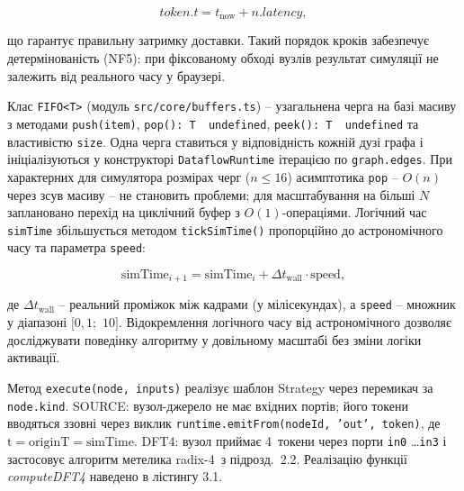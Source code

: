 \documentclass[
]{article}
\begin{document}
\[token.t = t_{\text{now}} + n.latency,\]

що гарантує правильну затримку доставки. Такий порядок кроків забезпечує
детермінованість (NF5): при фіксованому обході вузлів результат
симуляції не залежить від реального часу у браузері.

Клас \texttt{FIFO\textless{}T\textgreater{}} (модуль
\texttt{src}\texttt{/}\texttt{core}\texttt{/}\texttt{buffers.ts}) --
узагальнена черга на базі масиву з методами
\texttt{push}\texttt{(}\texttt{item}\texttt{)},
\texttt{pop}\texttt{():\ T\ \textbar{}\ }\texttt{undefined},
\texttt{peek}\texttt{():\ T\ \textbar{}\ }\texttt{undefined} та
властивістю \texttt{size}. Одна черга ставиться у відповідність кожній
дузі графа і ініціалізуються у конструкторі \texttt{DataflowRuntime}
ітерацією по \texttt{graph.edges}. При характерних для симулятора
розмірах черг (\(n \leq 16\)) асимптотика \texttt{pop} -- \(O(n)\) через
зсув масиву -- не становить проблеми; для масштабування на більші \(N\)
заплановано перехід на циклічний буфер з \(O(1)\)-операціями. Логічний
час \texttt{simTime} збільшується методом
\texttt{tickSimTime}\texttt{()} пропорційно до астрономічного часу та
параметра \texttt{speed}:

\[\text{simTime}_{i + 1} = \text{simTime}_{i} + \Delta t_{\text{wall}} \cdot \text{speed},\]

де \(\Delta t_{\text{wall}}\) -- реальний проміжок між кадрами (у
мілісекундах), а \texttt{speed} -- множник у діапазоні
\(\lbrack 0,1;\mspace{6mu} 10\rbrack\). Відокремлення логічного часу від
астрономічного дозволяє досліджувати поведінку алгоритму у довільному
масштабі без зміни логіки активації.

Метод
\texttt{execute}\texttt{(}\texttt{node}\texttt{,\ }\texttt{inputs}\texttt{)}
реалізує шаблон Strategy через перемикач за \texttt{node.kind}. SOURCE:
вузол-джерело не має вхідних портів; його токени вводяться ззовні через
виклик
\texttt{runtime.emitFrom}\texttt{(}\texttt{nodeId}\texttt{,\ ’}\texttt{out}\texttt{’,\ }\texttt{token}\texttt{)},
де \(\text{t} = \text{originT} = \text{simTime}\). DFT4: вузол приймає
4~токени через порти \texttt{in0} \ldots{}\texttt{in3} і застосовує
алгоритм метелика radix-4~з підрозд.~2.2. Реалізацію функції
\emph{computeDFT4} наведено в лістингу 3.1.
\end{document}
